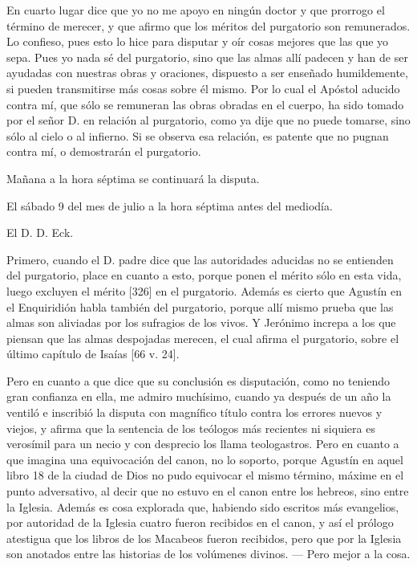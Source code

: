 En cuarto lugar dice que yo no me apoyo en ningún doctor y que prorrogo el término de merecer, y que afirmo que los méritos del purgatorio son remunerados. Lo confieso, pues esto lo hice para disputar y oír cosas mejores que las que yo sepa. Pues yo nada sé del purgatorio, sino que las almas allí padecen y han de ser ayudadas con nuestras obras y oraciones, dispuesto a ser enseñado humildemente, si pueden transmitirse más cosas sobre él mismo. Por lo cual el Apóstol aducido contra mí, que sólo se remuneran las obras obradas en el cuerpo, ha sido tomado por el señor D. en relación al purgatorio, como ya dije que no puede tomarse, sino sólo al cielo o al infierno. Si se observa esa relación, es patente que no pugnan contra mí, o demostrarán el purgatorio.

Mañana a la hora séptima se continuará la disputa.

El sábado 9 del mes de julio a la hora séptima antes del mediodía.

El D. D. Eck.

Primero, cuando el D. padre dice que las autoridades aducidas no se entienden del purgatorio, place en cuanto a esto, porque ponen el mérito sólo en esta vida, luego excluyen el mérito [326] en el purgatorio. Además es cierto que Agustín en el Enquiridión habla también del purgatorio, porque allí mismo prueba que las almas son aliviadas por los sufragios de los vivos. Y Jerónimo increpa a los que piensan que las almas despojadas merecen, el cual afirma el purgatorio, sobre el último capítulo de Isaías [66 v. 24].

Pero en cuanto a que dice que su conclusión es disputación, como no teniendo gran confianza en ella, me admiro muchísimo, cuando ya después de un año la ventiló e inscribió la disputa con magnífico título contra los errores nuevos y viejos, y afirma que la sentencia de los teólogos más recientes ni siquiera es verosímil para un necio y con desprecio los llama teologastros. Pero en cuanto a que imagina una equivocación del canon, no lo soporto, porque Agustín en aquel libro 18 de la ciudad de Dios no pudo equivocar el mismo término, máxime en el punto adversativo, al decir que no estuvo en el canon entre los hebreos, sino entre la Iglesia. Además es cosa explorada que, habiendo sido escritos más evangelios, por autoridad de la Iglesia cuatro fueron recibidos en el canon, y así el prólogo atestigua que los libros de los Macabeos fueron recibidos, pero que por la Iglesia son anotados entre las historias de los volúmenes divinos. — Pero mejor a la cosa.

